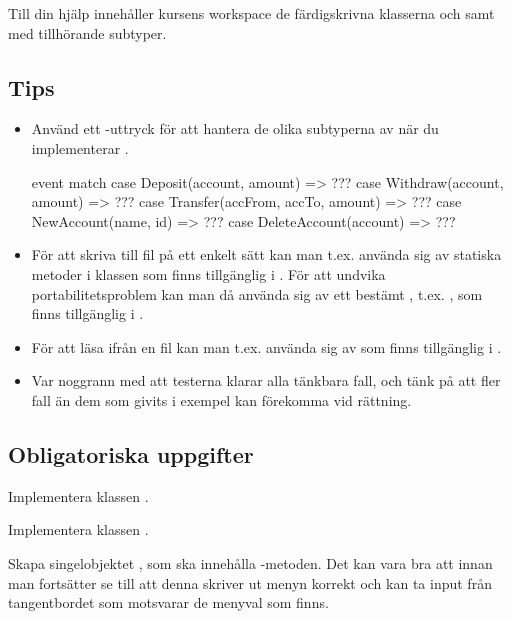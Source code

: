 Till din hjälp innehåller kursens workspace de färdigskrivna klasserna  och  samt  med tillhörande subtyper.


\subsection{Tips}

\begin{itemize}
\item Använd ett -uttryck för att hantera de olika subtyperna av  när du implementerar .
\begin{Code}
event match {
  case Deposit(account, amount) => ???
  case Withdraw(account, amount) => ???
  case Transfer(accFrom, accTo, amount) => ???
  case NewAccount(name, id) => ???
  case DeleteAccount(account) => ???
}
\end{Code}

\item För att skriva till fil på ett enkelt sätt kan man t.ex. använda sig av statiska metoder i klassen  som finns tillgänglig i . För att undvika portabilitetsproblem kan man då använda sig av ett bestämt , t.ex. , som finns tillgänglig i .

\item För att läsa ifrån en fil kan man t.ex. använda sig av  som finns tillgänglig i .

\item Var noggrann med att testerna klarar alla tänkbara fall, och tänk på att fler fall än dem som givits i exempel kan förekomma vid rättning.
\end{itemize}

\subsection{Obligatoriska uppgifter}

\Task Implementera klassen .

\Task Implementera klassen .

\Task Skapa singelobjektet , som ska innehålla -metoden. Det kan vara bra att innan man fortsätter se till att denna skriver ut menyn korrekt och kan ta input från tangentbordet som motsvarar de menyval som finns.

